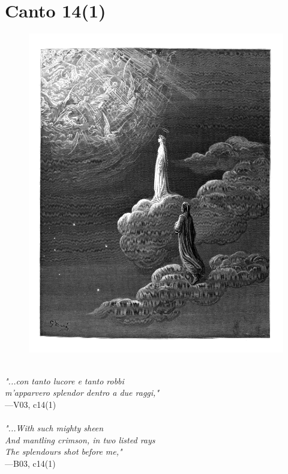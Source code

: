 \documentclass[../Dore_vision.tex]{subfiles}
\begin{document}
\newpage

\section{Canto 14(1)}

\begin{figure}[ht]
\centering
\includegraphics[height=\figsize]{illustrations/book_3/V03, c14(1).jpg}
\end{figure}

\begin{center}
\begin{minipage}{0.8\linewidth}
\textit{\\
"...con tanto lucore e tanto robbi\\m’apparvero splendor dentro a due raggi,"} \\
—V03, c14(1) \\~\\
\textit{"...With such mighty sheen\\And mantling crimson, in two listed rays\\The splendours shot before me,"} \\
—B03, c14(1)
\end{minipage}
\end{center}
\end{document}
